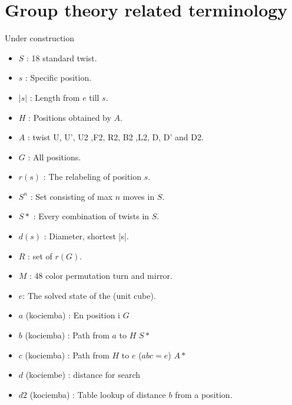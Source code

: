 \section{Group theory related terminology}
\huge{Under construction}
\begin{itemize}
\item $S$ : 18 standard twist.
\item $s$ : Specific position.
\item $|s|$ : Length from $e$ till $s$.
\item $H$ : Positions obtained by $A$.
\item $A$ : twist U, U', U2 ,F2, R2, B2 ,L2, D, D' and D2.
\item $G$ : All positions. 
\item $r(s)$ : The relabeling of position $s$.
\item $S^{n}$ : Set consisting of max $n$ moves in $S$.
\item $S*$ : Every combination of twists in $S$.
\item $d(s)$ : Diameter, shortest |s|.
\item $R$ : set of $r(G)$.
\item $M$ : 48 color permutation turn and mirror.
\item $e$: The solved state of the \rubik{}(unit cube).

\item $a$ (kociemba) : En position i $G$
\item $b$ (kociemba) : Path from $a$ to $H$ $S*$
\item $c$ (kociemba) : Path from $H$ to $e$ ($abc = e$) $A*$
\item $d$ (kociembe) : distance for search %
\item $d2$ (kociemba) : Table lookup of distance $b$ from a position.

\end{itemize}




